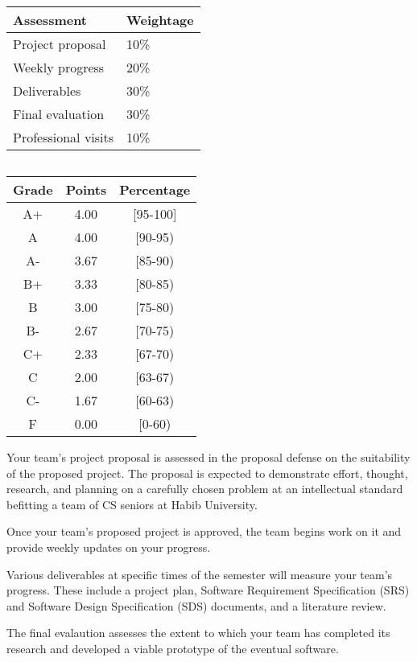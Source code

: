 \documentclass[a4paper]{article}
\newcommand{\new}[1]{{#1}}
\begin{document}
\begin{center}
\begin{tabular}{|l|l|}
  \hline
  \textbf{Assessment} & \textbf{Weightage} \\\hline\hline
  Project proposal & 10\% \\\hline
  Weekly progress & 20\% \\\hline
  Deliverables & 30\% \\\hline
  Final evaluation & 30\% \\\hline
  Professional visits & 10\% \\\hline
\end{tabular}
$\quad$
  \begin{tabular}{|*3{c|}}
\hline
\textbf{Grade} & \textbf{Points} & \textbf{Percentage}\\\hline\hline
A+ & 4.00 & [95-100] \\\hline
A & 4.00 & [90-95) \\\hline
A- & 3.67 & [85-90) \\\hline
B+ & 3.33 & [80-85) \\\hline
B & 3.00 & [75-80) \\\hline
B- & 2.67 & [70-75) \\\hline
C+ & 2.33 & [67-70) \\\hline
C & 2.00 & [63-67) \\\hline
C- & 1.67 & [60-63) \\\hline
F & 0.00 & [0-60) \\\hline
  \end{tabular}
\end{center}

\new{Your team's project proposal is assessed in the proposal defense on the suitability of the proposed project. The proposal is expected to demonstrate effort, thought, research, and planning on a carefully chosen problem at an intellectual standard befitting a team of CS seniors at Habib University.}

\new{Once your team's proposed project is approved, the team begins work on it and provide weekly updates on your progress.}

\new{Various deliverables at specific times of the semester will measure your team's progress. These include a project plan, Software Requirement Specification (SRS) and Software Design Specification (SDS) documents, and a literature review.}

\new{The final evalaution assesses the extent to which your team has completed its research and developed a viable prototype of the eventual software.}
\end{document}
